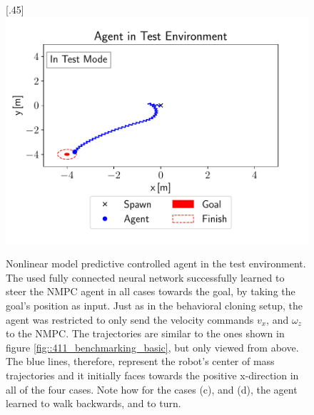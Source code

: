 \begin{figure}[h!]
	[.45\linewidth]{\includegraphics[scale=.45]{chapters/11_autonomous_walking_experiments/img/test_mode_m4_m4.pdf}}
	\caption{Nonlinear model predictive controlled agent in the test environment. The used fully connected neural network successfully learned to steer the NMPC agent in all cases towards the goal, by taking the goal's position as input. Just as in the behavioral cloning setup, the agent was restricted to only send the velocity commands $v_x$, and $\omega_z$ to the NMPC. The trajectories are similar to the ones shown in figure \ref{fig::411_benchmarking_basic}, but only viewed from above. The blue lines, therefore, represent the robot's center of mass trajectories and it initially faces towards the positive x-direction in all of the four cases. Note how for the cases (c), and (d), the agent learned to walk backwards, and to turn.}	
	\label{fig::432_nmpc_ppo_env}
\end{figure} 
